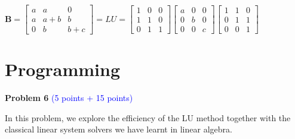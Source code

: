 \documentclass[english,onecolumn]{IEEEtran}
\begin{document}
\begin{enumerate}
            $
    \mathbf{B} = \begin{bmatrix}
    	a & a & 0\\
    	a & a+b & b \\
    	0 & b & b+c 
    \end{bmatrix}=LU=
    \begin{bmatrix}
    	1 & 0 & 0\\
    	1 & 1 & 0 \\
    	0 & 1 & 1 
    \end{bmatrix}
    \begin{bmatrix}
	a & 0 & 0\\
	0 & b & 0 \\
	0 & 0 & c 
	\end{bmatrix}
    \begin{bmatrix}
    	1 & 1 & 0\\
    	0& 1 & 1\\
    	0 & 0 & 1 
    \end{bmatrix}
    $
\end{enumerate}

\newpage
\section{Programming}
\noindent\textbf{Problem 6}
\textcolor{blue}{(5 points + 15 points)}

\noindent In this problem, we explore  the efficiency of the LU method together with the classical linear system solvers we have learnt in linear algebra. 
\end{document}
